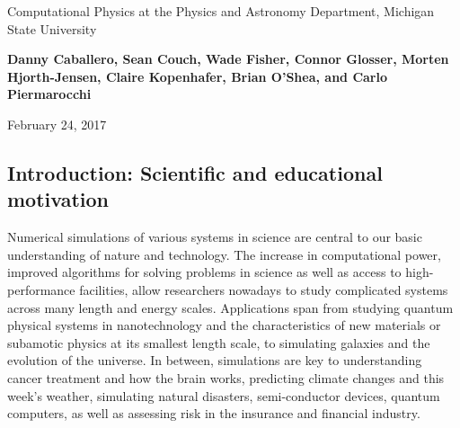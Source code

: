 \documentclass[%
oneside,                 %
final,                   %
10pt]{article}
\begin{document}

\newcommand{\exercisesection}[1]{\subsection*{#1}}






\thispagestyle{empty}

\begin{center}
{\LARGE\bf
\begin{spacing}{1.25}
Computational Physics at the Physics and Astronomy Department, Michigan State University
\end{spacing}
}
\end{center}


\begin{center}
{\bf Danny Caballero, Sean Couch, Wade Fisher, Connor Glosser, Morten Hjorth-Jensen, Claire Kopenhafer, Brian O'Shea, and Carlo Piermarocchi${}^{}$} \\ [0mm]
\end{center}

\begin{center}
\end{center}
    

\begin{center}
February 24, 2017
\end{center}

\vspace{1cm}


\subsection{Introduction: Scientific and educational motivation}

Numerical simulations of various systems in science are central to our
basic understanding of nature and technology.
The increase in computational power,
improved algorithms for solving problems in science as well as access
to high-performance facilities, allow researchers nowadays to study
complicated systems across many length and energy scales. Applications
span from studying quantum physical systems in nanotechnology and the
characteristics of new materials or subamotic physics at its smallest
length scale, to simulating galaxies and the evolution of the universe.
In between, simulations are key to understanding
cancer treatment and how the brain works,
predicting climate changes and this week's weather,
simulating natural disasters, semi-conductor devices,
quantum computers, as well as assessing risk in the insurance and
financial industry. 
\end{document}
